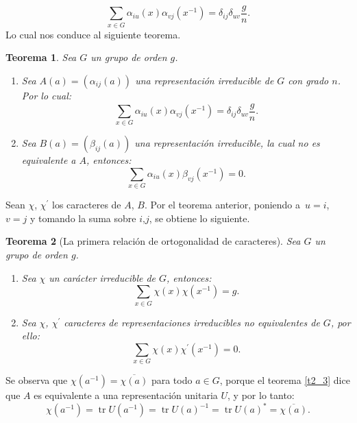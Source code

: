 \documentclass[12pt]{book}
\DeclareMathOperator{\tr}{tr}
\newtheorem{theorem}{Teorema}[section]
\theoremstyle{definition}
\newcounter{in}
\begin{document}
\begin{equation}
  \label{eq:31}
  \sum_{x \in G} \alpha_{iu}(x) \alpha_{vj}(x^{-1}) = \delta_{ij} \delta_{uv}\frac{g}{n}.
\end{equation}
Lo cual nos conduce al siguiente teorema.
\begin{theorem}
  \label{t4_3}
  Sea $G$ un grupo de orden $g$.
  \begin{enumerate}
  \item Sea $A(a)=(\alpha_{ij}(a))$ una representación irreducible de
    $G$ con grado $n$. Por lo cual:
    \begin{equation*}
      \sum_{x \in G} \alpha_{iu}(x) \alpha_{vj}(x^{-1})
      = \delta_{ij} \delta_{uv}\frac{g}{n}.
    \end{equation*}
  \item Sea $ B(a)=(\beta_{ij}(a))$ una representación irreducible, la
    cual no es equivalente a $A$, entonces:
    \begin{equation*}
      \sum_{x \in G} \alpha_{iu}(x) \beta_{vj}(x^{-1}) =0.
    \end{equation*}
    \end{enumerate}
\end{theorem}
Sean $\chi$, $\chi^{'}$ los caracteres de $A$, $B$. Por el teorema
anterior, poniendo a~$u=i$, $v=j$ y tomando la suma sobre $i$,$j$, se
obtiene lo siguiente.
\begin{theorem}[La primera relación de ortogonalidad de caracteres]
  \label{t4_4}
  Sea $G$ un grupo de orden $g$.
  \begin{enumerate}
  \item Sea $\chi$ un carácter irreducible de $G$, entonces:
  \begin{equation*}
    \sum_{x \in G} \chi(x) \chi(x^{-1}) = g.
  \end{equation*}
  \item Sea $\chi$, $\chi^{'}$ caracteres de representaciones
    irreducibles no equivalentes de $G$, por ello:
  \begin{equation*}
    \sum_{x \in G} \chi(x) \chi^{'}(x^{-1}) = 0.
  \end{equation*}
  \end{enumerate}
\end{theorem}
Se observa que $\chi(a^{-1})=\overline{\chi(a)}$ para todo $a \in G$,
porque el teorema \ref{t2_3} dice que $A$ es equivalente a una
representación unitaria $U$, y por lo tanto:
\begin{equation}
  \label{eq:34}
  \chi(a^{-1})=\tr U(a^{-1})=\tr U(a)^{-1}=\tr U(a)^{*} = \overline{\chi(a)}.  
\end{equation}
\end{document}
